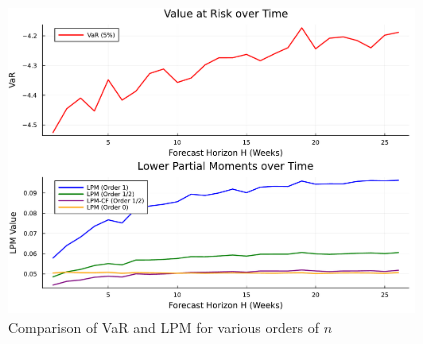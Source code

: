 \begin{figure}[H]
    \centering
    \includegraphics[width=0.96\textwidth]{figures/var_vs_lpm_alternative.pdf}
    \caption{Comparison of VaR and LPM for various orders of \(n\)}
    \label{fig:var_vs_lpm}
\end{figure}
